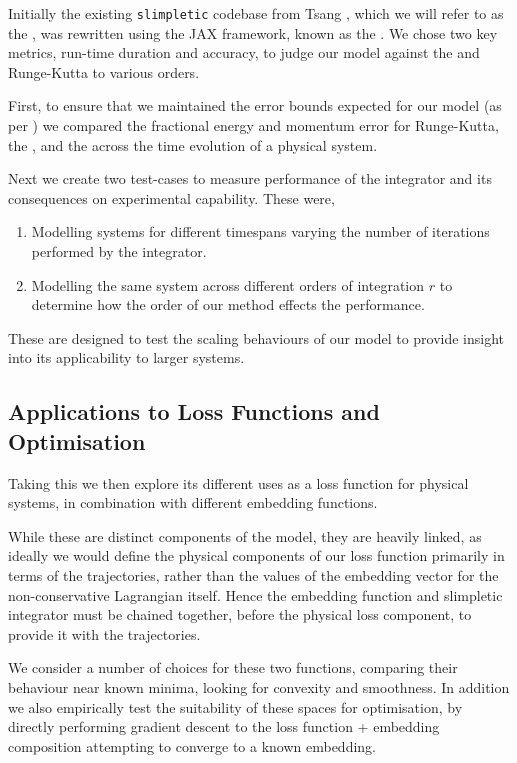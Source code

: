 Initially the existing \texttt{slimpletic} codebase from Tsang \etall \cite{originalCode}, which we will refer to as the \orgimpl{}, was rewritten using the JAX framework, known as the \updimpl{}. We chose two key metrics, run-time duration and accuracy, to judge our model against the \orgimpl{} and Runge-Kutta to various orders.

First, to ensure that we maintained the error bounds expected for our model (as per ) we compared the fractional energy and momentum error for Runge-Kutta, the \orgimpl{}, and the \updimpl{} across the time evolution of a physical system.

Next we create two test-cases to measure performance of the integrator and its consequences on experimental capability. These were,

\begin{enumerate}
	\item Modelling systems for different timespans varying the number of iterations performed by the integrator.
	\item Modelling the same system across different orders of integration $r$ to determine how the order of our method effects the performance.
\end{enumerate}

These are designed to test the scaling behaviours of our model to provide insight into its applicability to larger systems.

\subsection{Applications to Loss Functions and Optimisation}

Taking this \updimpl{} we then explore its different uses as a loss function for physical systems, in combination with different embedding functions.

While these are distinct components of the model, they are heavily linked, as ideally we would define the physical components of our loss function primarily in terms of the trajectories, rather than the values of the embedding vector for the non-conservative Lagrangian itself.
Hence the embedding function and slimpletic integrator must be chained together, before the physical loss component, to provide it with the trajectories.

We consider a number of choices for these two functions, comparing their behaviour near known minima, looking for convexity and smoothness. In addition we also empirically test the suitability of these spaces for optimisation, by directly performing gradient descent to the loss function + embedding composition attempting to converge to a known embedding.

